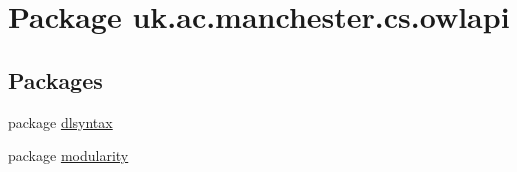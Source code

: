 \hypertarget{namespaceuk_1_1ac_1_1manchester_1_1cs_1_1owlapi}{\section{Package uk.\-ac.\-manchester.\-cs.\-owlapi}
\label{namespaceuk_1_1ac_1_1manchester_1_1cs_1_1owlapi}
}
\subsection*{Packages}
\begin{DoxyCompactItemize}
\item 
package \hyperlink{namespaceuk_1_1ac_1_1manchester_1_1cs_1_1owlapi_1_1dlsyntax}{dlsyntax}
\item 
package \hyperlink{namespaceuk_1_1ac_1_1manchester_1_1cs_1_1owlapi_1_1modularity}{modularity}
\end{DoxyCompactItemize}
